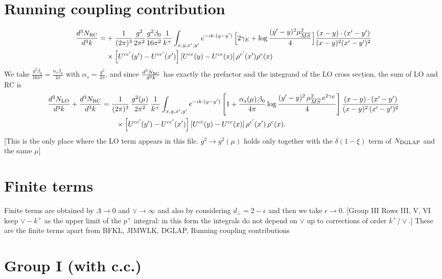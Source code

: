 \documentclass[9pt]{article}
\numberwithin{equation}{section}
\begin{document}
\section{Running coupling contribution}
\begin{align}
\frac{d^{3}N_{\rm RC}}{d^{3}k}= & +\frac{1}{(2\pi)^{3}}\frac{g^{2}}{2\pi^{2}}\frac{g^{2}\beta_{0}}{16\pi^{2}}\frac{1}{k^{+}}\int_{x,y,x',y'}e^{-ik\cdot(y-y')}\,\Big[2\gamma_{E}+\log\frac{(y'-y)^{2}\mu^{2}_{\overline{MS}}}{4}\Big]\frac{(x-y)\cdot(x'-y')}{(x-y)^{2}(x'-y')^{2}}\notag\\
&\times\left[U^{ce'}(y') - U^{ce'}(x')\right]\left[U^{ce}(y) - U^{ce}(x)\right]\rho^{e'}(x')\rho^{e}(x)
\end{align}
We take $\frac{g^{2}\beta_{0}}{16\pi^{2}}=\frac{\alpha_{s}\beta_{0}}{4\pi}$ with $\alpha_{s}=\frac{g^{2}}{4\pi}$, and since $\frac{d^{3}N_{\rm RC}}{d^{3}k}$ has exactly the prefactor and the integrand of the LO cross section, the sum of LO and RC is
\begin{align}
\frac{d^{3}N_{\rm LO}}{d^{3}k}+\frac{d^{3}N_{\rm RC}}{d^{3}k}&=\frac{1}{(2\pi)^{3}}\,\frac{g^{2}(\mu)}{2\pi^{2}}\,\frac{1}{k^{+}}\int_{x,y,x',y'}e^{-ik\cdot(y-y')}\left[1+\frac{\alpha_{s}(\mu)\,\beta_{0}}{4\pi}\log\frac{(y'-y)^{2}\,\mu^{2}_{\overline{MS}}\,e^{2\gamma_{E}}}{4}\right]\frac{(x-y)\cdot(x'-y')}{(x-y)^{2}\,(x'-y')^{2}}\notag\\
&\qquad\times\left[U^{ce'}(y')-U^{ce'}(x')\right]\left[U^{ce}(y)-U^{ce}(x)\right]\rho^{e'}(x')\,\rho^{e}(x).
\end{align} {\color{red}[This is the only place where the LO term appears in this file. $g^{2}\to g^{2}(\mu)$ holds only together with the $\delta(1-\xi)$ term of $N_{\rm DGLAP}$ and the same $\mu$]}\par\noindent
\section{Finite terms}
Finite terms are obtained by $\Lambda \to 0$ and $\vee\to \infty $ and also by considering $d_{\perp} = 2-\epsilon$ and then we take $\epsilon \to 0$. {\color{red}[Group III Rows III, V, VI keep $\vee-k^{+}$ as the upper limit of the $p^{+}$ integral: in this form the integrals do not depend on $\vee$ up to corrections of order $k^{+}/\vee$.]} 
These are the finite terms apart from BFKL, JIMWLK, DGLAP, Running coupling contributions
\section{Group I (with c.c.)}
\end{document}
